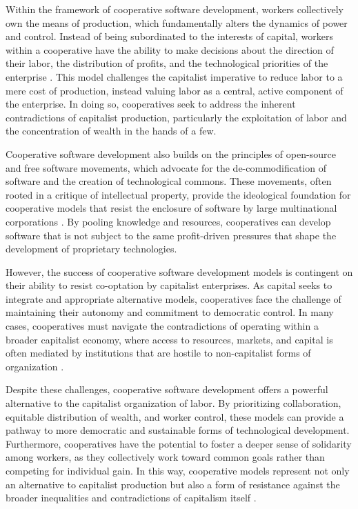 Within the framework of cooperative software development, workers collectively own the means of production, which fundamentally alters the dynamics of power and control. Instead of being subordinated to the interests of capital, workers within a cooperative have the ability to make decisions about the direction of their labor, the distribution of profits, and the technological priorities of the enterprise \cite[pp.~125-127]{scholz2016}. This model challenges the capitalist imperative to reduce labor to a mere cost of production, instead valuing labor as a central, active component of the enterprise. In doing so, cooperatives seek to address the inherent contradictions of capitalist production, particularly the exploitation of labor and the concentration of wealth in the hands of a few.

Cooperative software development also builds on the principles of open-source and free software movements, which advocate for the de-commodification of software and the creation of technological commons. These movements, often rooted in a critique of intellectual property, provide the ideological foundation for cooperative models that resist the enclosure of software by large multinational corporations \cite[pp.~47-49]{raymond1999}. By pooling knowledge and resources, cooperatives can develop software that is not subject to the same profit-driven pressures that shape the development of proprietary technologies.

However, the success of cooperative software development models is contingent on their ability to resist co-optation by capitalist enterprises. As capital seeks to integrate and appropriate alternative models, cooperatives face the challenge of maintaining their autonomy and commitment to democratic control. In many cases, cooperatives must navigate the contradictions of operating within a broader capitalist economy, where access to resources, markets, and capital is often mediated by institutions that are hostile to non-capitalist forms of organization \cite[pp.~66-68]{schweik2009}.

Despite these challenges, cooperative software development offers a powerful alternative to the capitalist organization of labor. By prioritizing collaboration, equitable distribution of wealth, and worker control, these models can provide a pathway to more democratic and sustainable forms of technological development. Furthermore, cooperatives have the potential to foster a deeper sense of solidarity among workers, as they collectively work toward common goals rather than competing for individual gain. In this way, cooperative models represent not only an alternative to capitalist production but also a form of resistance against the broader inequalities and contradictions of capitalism itself \cite[pp.~91-93]{draper2012}.

